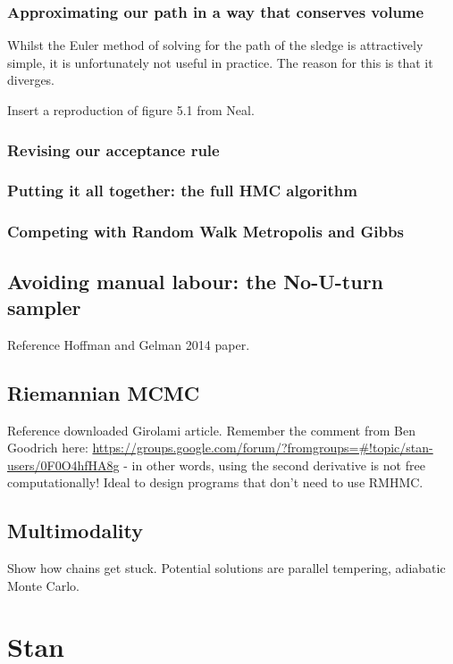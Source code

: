 \documentclass[11pt,fullpage]{book}
\begin{document}
\subsection{Approximating our path in a way that conserves volume}
Whilst the Euler method of solving for the path of the sledge is attractively simple, it is unfortunately not useful in practice. The reason for this is that it diverges. 

Insert a reproduction of figure 5.1 from Neal.

\subsection{Revising our acceptance rule}


\subsection{Putting it all together: the full HMC algorithm}\label{sec:HMC_fullHMCalgorithm}

\subsection{Competing with Random Walk Metropolis and Gibbs}

\section{Avoiding manual labour: the No-U-turn sampler}
Reference Hoffman and Gelman 2014 paper.


\section{Riemannian MCMC}
Reference downloaded Girolami article.
Remember the comment from Ben Goodrich here: \url{https://groups.google.com/forum/?fromgroups=#!topic/stan-users/0F0O4hfHA8g} - in other words, using the second derivative is not free computationally! Ideal to design programs that don't need to use RMHMC.

\section{Multimodality}
Show how chains get stuck. Potential solutions are parallel tempering, adiabatic Monte Carlo.


\chapter{Stan}\label{chap:StanJAGS}
\end{document}
